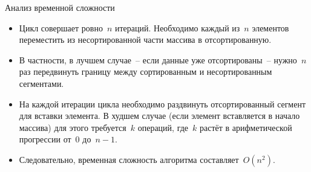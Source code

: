 \documentclass[landscape]{slides}
\begin{document}
\begin{slide}
  Анализ временной сложности
  \begin{itemize}
      \item Цикл совершает ровно~$n$ итераций. Необходимо каждый из~$n$ элементов переместить из несортированной части
        массива в отсортированную.
      \item В частности, в лучшем случае~-- если данные уже отсортированы~-- нужно~$n$ раз передвинуть границу между
        сортированным и несортированным сегментами.
      \item На каждой итерации цикла необходимо раздвинуть отсортированный сегмент для вставки элемента. В худшем случае
        (если элемент вставляется в начало массива) для этого требуется~$k$ операций, где~$k$ растёт в арифметической
        прогрессии от~$0$ до~$n-1$.
      \item Следовательно, временная сложность алгоритма составляет~$O(n^2)$.
  \end{itemize}
\end{slide}
\end{document}
